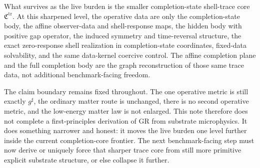 \documentclass[11pt]{article}
\newcommand{\CompletedMetric}{g^{\sharp}}
\newcommand{\TraceCore}{\mathfrak C^{\mathrm{tr}}}
\begin{document}
What survives as the live burden is the smaller completion-state shell-trace core \(\TraceCore\). At this sharpened level, the operative data are only the completion-state body, the affine observer-data and shell-response maps, the hidden body with positive gap operator, the induced symmetry and time-reversal structure, the exact zero-response shell realization in completion-state coordinates, fixed-data solvability, and the same data-kernel coercive control. The affine completion plane and the full completion body are the graph reconstruction of those same trace data, not additional benchmark-facing freedom.

The claim boundary remains fixed throughout. The one operative metric is still exactly \(\CompletedMetric\), the ordinary matter route is unchanged, there is no second operative metric, and the low-energy matter law is not enlarged. This note therefore does not complete a first-principles derivation of GR from substrate microphysics. It does something narrower and honest: it moves the live burden one level further inside the current completion-core frontier. The next benchmark-facing step must now derive or uniquely force that sharper trace core from still more primitive explicit substrate structure, or else collapse it further.
\end{document}
